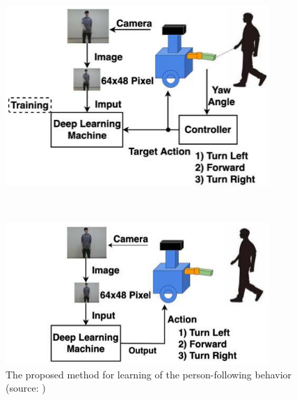   \begin{figure}[h]
    \centering
    \begin{minipage}[c]{100mm} 
        \centering
        \includegraphics[width=100mm]{images/pdf/okada_learning_phase_system.pdf}
    \end{minipage} \\
    \vspace{1em} %
    \begin{minipage}[c]{100mm} 
        \centering
        \includegraphics[width=100mm]{images/pdf/okada_following_phase_system.pdf}
    \end{minipage}
    \caption[The proposed method for learning of the person-following behavior]{The proposed method for learning of the person-following behavior (source: \cite{okada})}
    \label{Fig:okada_system}
  \end{figure}

\newpage

